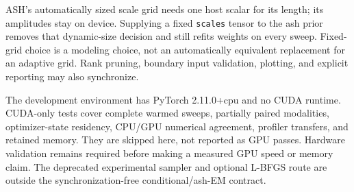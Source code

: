 ASH's automatically sized scale grid needs one host scalar for its length;
its amplitudes stay on device. Supplying a fixed \texttt{scales} tensor to
the ash prior removes that dynamic-size decision and still refits weights
on every sweep. Fixed-grid choice is a modeling choice, not an automatically
equivalent replacement for an adaptive grid. Rank pruning, boundary input
validation, plotting, and explicit reporting may also synchronize.

The development environment has PyTorch 2.11.0+cpu and no CUDA runtime.
CUDA-only tests cover complete warmed sweeps, partially paired modalities,
optimizer-state residency, CPU/GPU numerical agreement, profiler transfers,
and retained memory. They are skipped here, not reported as GPU passes.
Hardware validation remains required before making a measured GPU speed or
memory claim. The deprecated experimental sampler and optional L-BFGS route
are outside the synchronization-free conditional/ash-EM contract.
